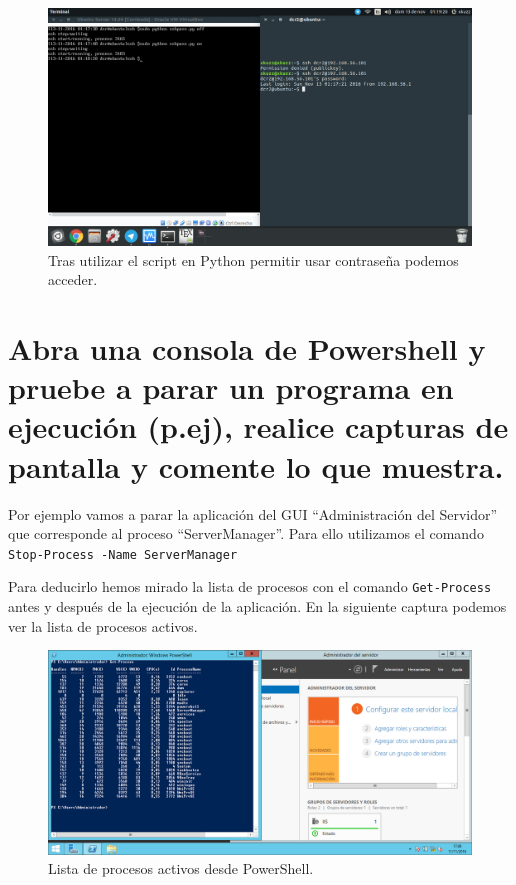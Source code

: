 \begin{flushleft}
\begin{figure}[H]
	\centering
	\includegraphics[scale=0.3]{pyon.png}
	\caption{Tras utilizar el script en Python permitir usar contraseña podemos acceder.}
\end{figure}

\section{Abra una consola de Powershell y pruebe a parar un programa en ejecución (p.ej), realice capturas de pantalla y comente lo que muestra.}
Por ejemplo vamos a parar la aplicación del GUI ``Administración del Servidor'' que corresponde al proceso ``ServerManager''. Para ello utilizamos el comando \verb|Stop-Process -Name ServerManager| \cite{c17}

Para deducirlo hemos mirado la lista de procesos con el comando \verb|Get-Process| antes y después de la ejecución de la aplicación. En la siguiente captura podemos ver la lista de procesos activos.

\begin{figure}[H]
	\centering
	\includegraphics[scale=0.4]{pwshell1.png}
	\caption{Lista de procesos activos desde PowerShell.}
\end{figure}


\end{flushleft}
